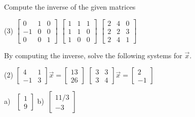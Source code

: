 \begin{exercise}\ansMark%
Compute the inverse of the given matrices
\begin{tasks}(3)
\task
$\begin{bmatrix}
0 & 1 & 0 \\
-1 & 0 & 0 \\
0 & 0 & 1
\end{bmatrix}$
\task
$\begin{bmatrix}
1 & 1 & 1 \\
1 & 1 & 0 \\
1 & 0 & 0
\end{bmatrix}$
\task
$\begin{bmatrix}
2 & 4 & 0 \\
2 & 2 & 3 \\
2 & 4 & 1
\end{bmatrix}$
\end{tasks}
\end{exercise}

\begin{exercise}
By computing the inverse,
solve the following systems for $\vec{x}$.
\begin{tasks}(2)
\task
$\begin{bmatrix}
4 & 1 \\
-1 & 3
\end{bmatrix} \vec{x} =
\begin{bmatrix} 13 \\ 26 \end{bmatrix}$
\task
$\begin{bmatrix}
3 & 3 \\
3 & 4
\end{bmatrix} \vec{x} =
\begin{bmatrix} 2 \\ -1 \end{bmatrix}$
\end{tasks}
\end{exercise}
\comboSol{%
}
{%
a)~ $\left[\begin{smallmatrix}  1 \\ 9 \end{smallmatrix}\right]$ \quad b)~$\left[\begin{smallmatrix} 11/3 \\ -3 \end{smallmatrix}\right]$
}

